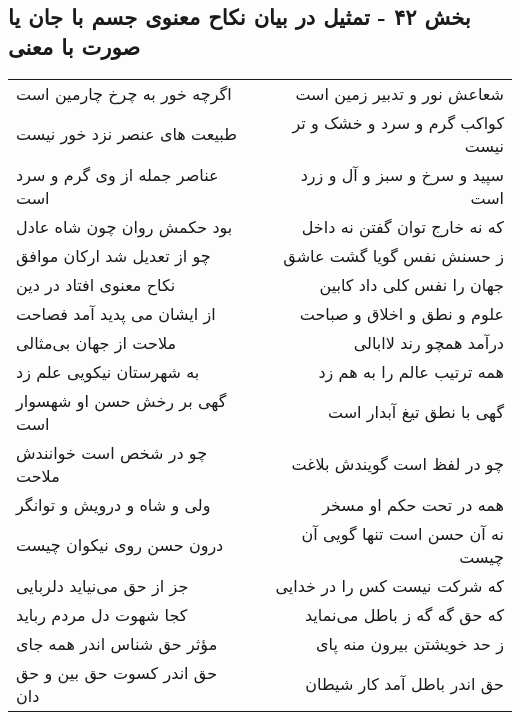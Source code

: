 \begin{center}
\section*{بخش ۴۲ - تمثیل در بیان نکاح معنوی جسم با جان یا صورت با معنی}
\label{sec:sh042}
\begin{longtable}{l p{0.5cm} r}
اگرچه خور به چرخ چارمین است
&&
شعاعش نور و تدبیر زمین است
\\
طبیعت های عنصر نزد خور نیست
&&
کواکب گرم و سرد و خشک و تر نیست
\\
عناصر جمله از وی گرم و سرد است
&&
سپید و سرخ و سبز و آل و زرد است
\\
بود حکمش روان چون شاه عادل
&&
که نه خارج توان گفتن نه داخل
\\
چو از تعدیل شد ارکان موافق
&&
ز حسنش نفس گویا گشت عاشق
\\
نکاح معنوی افتاد در دین
&&
جهان را نفس کلی داد کابین
\\
از ایشان می پدید آمد فصاحت
&&
علوم و نطق و اخلاق و صباحت
\\
ملاحت از جهان بی‌مثالی
&&
درآمد همچو رند لاابالی
\\
به شهرستان نیکویی علم زد
&&
همه ترتیب عالم را به هم زد
\\
گهی بر رخش حسن او شهسوار است
&&
گهی با نطق تیغ آبدار است
\\
چو در شخص است خوانندش ملاحت
&&
چو در لفظ است گویندش بلاغت
\\
ولی و شاه و درویش و توانگر
&&
همه در تحت حکم او مسخر
\\
درون حسن روی نیکوان چیست
&&
نه آن حسن است تنها گویی آن چیست
\\
جز از حق می‌نیاید دلربایی
&&
که شرکت نیست کس را در خدایی
\\
کجا شهوت دل مردم رباید
&&
که حق گه گه ز باطل می‌نماید
\\
مؤثر حق شناس اندر همه جای
&&
ز حد خویشتن بیرون منه پای
\\
حق اندر کسوت حق بین و حق دان
&&
حق اندر باطل آمد کار شیطان
\\
\end{longtable}
\end{center}
